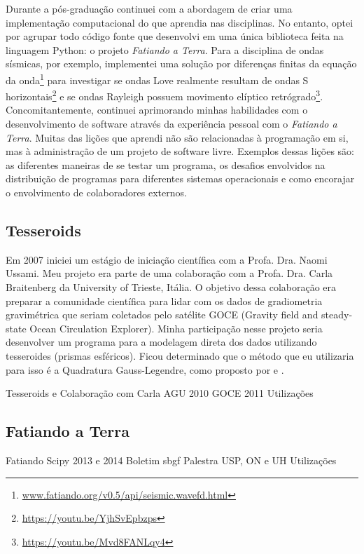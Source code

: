Durante a pós-graduação continuei com a abordagem de criar uma implementação
computacional do que aprendia nas disciplinas.
No entanto, optei por agrupar todo código fonte que desenvolvi em uma única
biblioteca feita na linguagem Python: o projeto \textit{Fatiando a Terra}.
Para a disciplina de ondas sísmicas, por exemplo, implementei uma solução por
diferenças finitas da equação da
onda\footnote{\url{www.fatiando.org/v0.5/api/seismic.wavefd.html}} para
investigar se ondas Love realmente resultam de ondas S
horizontais\footnote{\url{https://youtu.be/YjhSvEpbzps}} e se ondas Rayleigh
possuem movimento elíptico
retrógrado\footnote{\url{https://youtu.be/Mvd8FANLqy4}}.
Concomitantemente, continuei aprimorando minhas habilidades com o
desenvolvimento de software através da experiência pessoal com o
\textit{Fatiando a Terra}.
Muitas das lições que aprendi não são relacionadas à programação em si, mas à
administração de um projeto de software livre.
Exemplos dessas lições são: as diferentes maneiras de se testar um programa,
os desafios envolvidos na distribuição de programas para diferentes sistemas
operacionais e como encorajar o envolvimento de colaboradores externos.


\subsection{Tesseroids}

Em 2007 iniciei um estágio de iniciação científica com a Profa. Dra. Naomi
Ussami.
Meu projeto era parte de uma colaboração com a Profa. Dra. Carla Braitenberg da
University of Trieste, Itália.
O objetivo dessa colaboração era preparar a comunidade científica para lidar
com os dados de gradiometria gravimétrica que seriam coletados pelo satélite
GOCE (Gravity field and steady-state Ocean Circulation Explorer).
Minha participação nesse projeto seria desenvolver um programa para a modelagem
direta dos dados utilizando tesseroides (prismas esféricos).
Ficou determinado que o método que eu utilizaria para isso é a Quadratura
Gauss-Legendre, como proposto por \citet{asgharzadeh2007} e
\citet{wild-pfeiffer2008}.




Tesseroids e Colaboração com Carla
AGU 2010
GOCE 2011
Utilizações


\subsection{Fatiando a Terra}

Fatiando
Scipy 2013 e 2014
Boletim sbgf
Palestra USP, ON e UH
Utilizações

